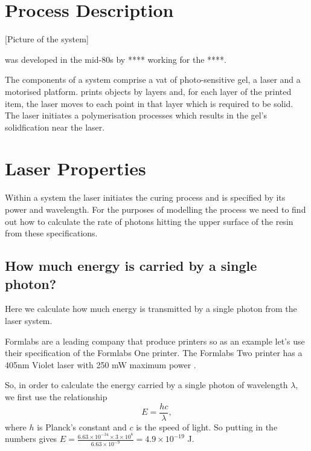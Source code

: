 \section{\SL Process Description}

[Picture of the \SL system]

\SL was developed in the mid-80s by **** working for the ****. 

The components of a \SL system comprise a vat of photo-sensitive gel, a laser and a motorised platform. \SL prints objects by layers and, for each layer of the printed item, the laser moves to each point in that layer which is required to be solid. The laser initiates a polymerisation processes which results in the gel's solidfication near the laser. 


\section{Laser Properties}


Within a \SL system the laser initiates the curing process and is specified by its power and wavelength. For the purposes of modelling the \SL process we need to find out how to calculate the rate of photons hitting the upper surface of the resin from these specifications. 

\subsection{How much energy is carried by a single photon?} 

Here we calculate how much energy is transmitted by a single photon from the \SL laser system. 

Formlabs are a leading company that produce \SL printers so as an example let's use their specification of the Formlabs One \SL printer. The Formlabs Two \SL printer has a 405nm Violet laser with 250 mW maximum power . 

So, in order to calculate the energy carried by a single photon of wavelength $\lambda$, we first use the relationship
\begin{equation}
E = \frac{hc}{\lambda}, 
\end{equation}
where $h$ is Planck's constant and $c$ is the speed of light. So putting in the numbers gives $E = \frac{6.63 \times 10^{-34} \times 3 \times 10^{8} }{6.63 \times 10^{-9}} = 4.9 \times 10^{-19}$ J. 

